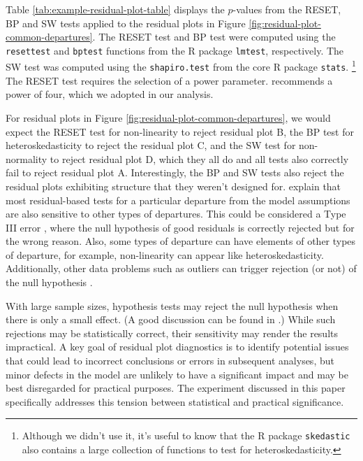 \documentclass[]{interact}
\theoremstyle{plain}%
\theoremstyle{definition}
\theoremstyle{remark}
\begin{document}
Table \ref{tab:example-residual-plot-table} displays the \(p\)-values
from the RESET, BP and SW tests applied to the residual plots in Figure
\ref{fig:residual-plot-common-departures}. The RESET test and BP test
were computed using the \texttt{resettest} and \texttt{bptest} functions
from the R package \texttt{lmtest}, respectively. The SW test was
computed using the \texttt{shapiro.test} from the core R package
\texttt{stats}. \footnote{Although we didn't use it, it's useful to know
  that the R package \texttt{skedastic} \citep{skedastic} also contains
  a large collection of functions to test for heteroskedasticity.} The
RESET test requires the selection of a power parameter.
\citet{ramsey1969tests} recommends a power of four, which we adopted in
our analysis.

For residual plots in Figure \ref{fig:residual-plot-common-departures},
we would expect the RESET test for non-linearity to reject residual plot
B, the BP test for heteroskedasticity to reject the residual plot C, and
the SW test for non-normality to reject residual plot D, which they all
do and all tests also correctly fail to reject residual plot A.
Interestingly, the BP and SW tests also reject the residual plots
exhibiting structure that they weren't designed for.
\citet{cook1982residuals} explain that most residual-based tests for a
particular departure from the model assumptions are also sensitive to
other types of departures. This could be considered a Type III error
\citep{kimball1957errors}, where the null hypothesis of good residuals
is correctly rejected but for the wrong reason. Also, some types of
departure can have elements of other types of departure, for example,
non-linearity can appear like heteroskedasticity. Additionally, other
data problems such as outliers can trigger rejection (or not) of the
null hypothesis \citep{cook1999applied}.

With large sample sizes, hypothesis tests may reject the null hypothesis
when there is only a small effect. (A good discussion can be found in
\citet{kirk1996practical}.) While such rejections may be statistically
correct, their sensitivity may render the results impractical. A key
goal of residual plot diagnostics is to identify potential issues that
could lead to incorrect conclusions or errors in subsequent analyses,
but minor defects in the model are unlikely to have a significant impact
and may be best disregarded for practical purposes. The experiment
discussed in this paper specifically addresses this tension between
statistical and practical significance.
\end{document}
